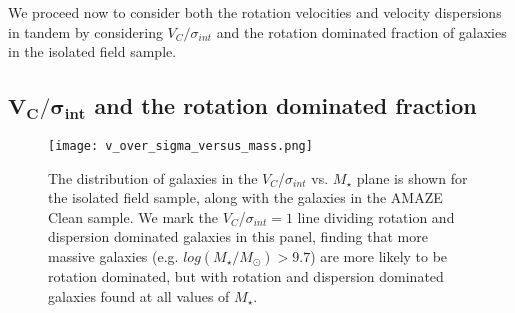 \documentclass[fleqn,usenatbib]{mn2e}
\begin{document}
We proceed now to consider both the rotation velocities and velocity dispersions in tandem by considering $V_{C}/\sigma_{int}$ and the rotation dominated fraction of galaxies in the isolated field sample.


\subsection{$\boldsymbol{V_{C}/\sigma_{int}}$ and the rotation dominated fraction}\label{subsec:rdf_v_over_sigma}

\begin{figure}
    \centering \hspace{-1.13cm}
    \texttt{[image: v\_over\_sigma\_versus\_mass.png]}
    \caption{The distribution of galaxies in the $V_{C}$/$\sigma_{int}$ vs. $M_{\star}$ plane is shown for the isolated field sample, along with the galaxies in the AMAZE Clean sample.
    We mark the $V_{C}$/$\sigma_{int}=1$ line dividing rotation and dispersion dominated galaxies in this panel, finding that more massive galaxies (e.g. $log(M_{\star}/M_{\odot}) > 9.7$) are more likely to be rotation dominated, but with rotation and dispersion dominated galaxies found at all values of $M_{\star}$.}
    \label{fig:v_sig_and_v}
\end{figure}
\end{document}
